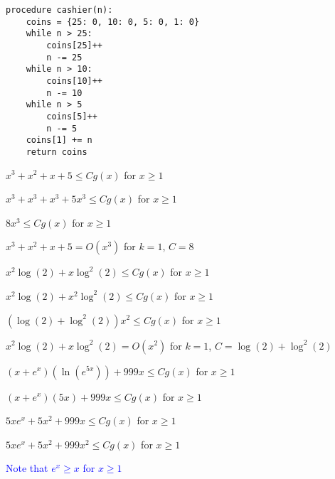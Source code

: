 \documentclass{exam}
\begin{document}
\begin{questions}
\begin{center}

\begin{verbatim}
procedure cashier(n):
    coins = {25: 0, 10: 0, 5: 0, 1: 0}
    while n > 25:
        coins[25]++
        n -= 25
    while n > 10:
        coins[10]++
        n -= 10
    while n > 5
        coins[5]++
        n -= 5
    coins[1] += n
    return coins
\end{verbatim}

\end{center}

\newpage

\begin{subparts}

\begin{center}
\( x^3 + x^2 + x + 5 \leq Cg(x) \) for \(x \geq 1\)

\( x^3 + x^3 + x^3 + 5x^3 \leq Cg(x) \) for \(x \geq 1\)

\( 8x^3 \leq Cg(x) \) for \(x \geq 1\)

\( x^3 + x^2 + x + 5 = O(x^3)\) for \(k = 1\), \(C = 8\)
\end{center}


\begin{center}
\( x^2\log(2) + x\log^2(2) \leq Cg(x) \) for \(x \geq 1\)

\( x^2\log(2) + x^2\log^2(2) \leq Cg(x) \) for \(x \geq 1\)

\( (\log(2) + \log^2(2))x^2 \leq Cg(x) \) for \(x \geq 1\)

\( x^2\log(2) + x\log^2(2) = O(x^2)\) for \(k = 1\), \(C = \log(2) + \log^2(2)\)
\end{center}


\begin{center}
\( (x + e^x)(\ln(e^{5x})) + 999x \leq Cg(x) \) for \(x \geq 1\)

\( (x + e^x)(5x) + 999x \leq Cg(x) \) for \(x \geq 1\)

\( 5xe^x + 5x^2 + 999x \leq Cg(x) \) for \(x \geq 1\)

\( 5xe^x + 5x^2 + 999x^2 \leq Cg(x) \) for \(x \geq 1\)
\vspace{5px}

\textcolor{blue}{Note that \(e^x \geq x\) for \(x \geq 1\)}
\vspace{5px}


\end{center}
\end{subparts}
\end{questions}
\end{document}
